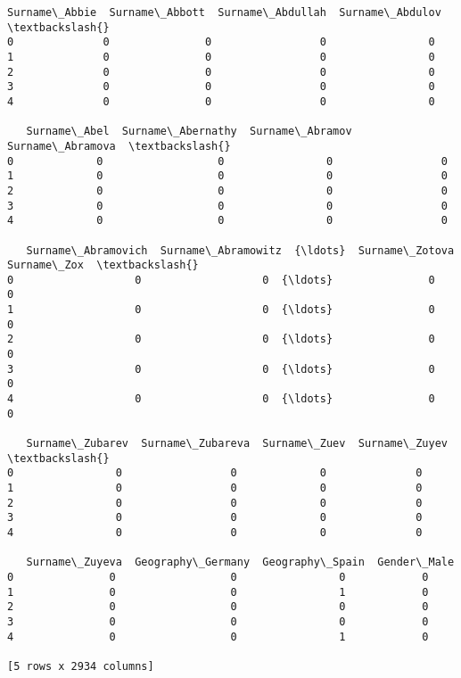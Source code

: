 \documentclass[11pt]{article}
\makeatletter
\newcommand{\boxspacing}{\kern\kvtcb@left@rule\kern\kvtcb@boxsep}
\newcommand{\prompt}[4]{
        {\ttfamily\llap{{\color{#2}[#3]:\hspace{3pt}#4}}\vspace{-\baselineskip}}
    }
\makeatother
\begin{document}
            \begin{tcolorbox}[breakable, size=fbox, boxrule=.5pt, pad at break*=1mm, opacityfill=0]
\prompt{Out}{outcolor}{93}{\boxspacing}
\begin{Verbatim}[commandchars=\\\{\}]
   Surname\_Abbie  Surname\_Abbott  Surname\_Abdullah  Surname\_Abdulov  \textbackslash{}
0              0               0                 0                0
1              0               0                 0                0
2              0               0                 0                0
3              0               0                 0                0
4              0               0                 0                0

   Surname\_Abel  Surname\_Abernathy  Surname\_Abramov  Surname\_Abramova  \textbackslash{}
0             0                  0                0                 0
1             0                  0                0                 0
2             0                  0                0                 0
3             0                  0                0                 0
4             0                  0                0                 0

   Surname\_Abramovich  Surname\_Abramowitz  {\ldots}  Surname\_Zotova  Surname\_Zox  \textbackslash{}
0                   0                   0  {\ldots}               0            0
1                   0                   0  {\ldots}               0            0
2                   0                   0  {\ldots}               0            0
3                   0                   0  {\ldots}               0            0
4                   0                   0  {\ldots}               0            0

   Surname\_Zubarev  Surname\_Zubareva  Surname\_Zuev  Surname\_Zuyev  \textbackslash{}
0                0                 0             0              0
1                0                 0             0              0
2                0                 0             0              0
3                0                 0             0              0
4                0                 0             0              0

   Surname\_Zuyeva  Geography\_Germany  Geography\_Spain  Gender\_Male
0               0                  0                0            0
1               0                  0                1            0
2               0                  0                0            0
3               0                  0                0            0
4               0                  0                1            0

[5 rows x 2934 columns]
\end{Verbatim}
\end{tcolorbox}
        
\end{document}
